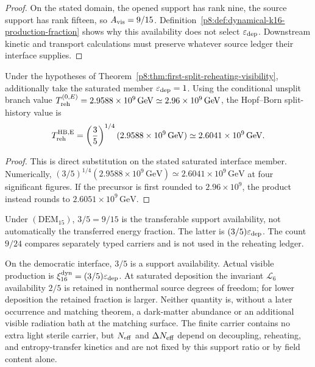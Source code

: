 \documentclass[12pt,a4paper]{article}
\begin{document}
\begin{proof}
On the stated domain, the opened support has rank nine, the source support has
rank fifteen, so \(A_{\rm vis}=9/15\).  Definition~\ref{p8:def:dynamical-k16-production-fraction}
shows why this availability does not select \(\varepsilon_{\rm dep}\).
Downstream kinetic
and transport calculations must preserve whatever source ledger their
interface supplies.
\end{proof}

\begin{corollary}
\label{p8:cor:first-split-reheating-value}
Under the hypotheses of
Theorem~\ref{p8:thm:first-split-reheating-visibility}, additionally take the
saturated member \(\varepsilon_{\rm dep}=1\).  Using the conditional
unsplit branch value
\(T_{\rm reh}^{(0,E)}=2.9588\times10^9\,{\rm GeV}\simeq2.96\times10^9\,{\rm GeV}\),
the Hopf--Born split-history value is
\begin{equation}
\label{p8:eq:Treh-HB-number}
T_{\rm reh}^{\rm HB,E}
=
\left(\frac35\right)^{1/4}
(2.9588\times10^9\,{\rm GeV})
\simeq
2.6041\times10^9\,{\rm GeV}.
\end{equation}
\end{corollary}

\begin{proof}
This is direct substitution on the stated saturated interface member.  Numerically,
\((3/5)^{1/4}(2.9588\times10^9\,\mathrm{GeV})
\simeq2.6041\times10^9\,\mathrm{GeV}\) at four significant figures.
If the precursor is first rounded to \(2.96\times10^9\), the product
instead rounds to \(2.6051\times10^9\,\mathrm{GeV}\).
\end{proof}

\begin{remark}
\label{p8:rem:first-split-normalization}
Under \((\mathrm{DEM}_{15})\), \(3/5=9/15\) is the transferable support
availability, not automatically the transferred energy fraction.  The latter
is \((3/5)\varepsilon_{\rm dep}\).  The count \(9/24\) compares separately
typed carriers and is not used in the reheating ledger.
\end{remark}

\begin{remark}
\label{p8:rem:first-split-no-energy-loss}
On the democratic interface, \(3/5\) is a support availability.  Actual
visible production is \(\xi_{16}^{\rm dyn}=(3/5)\varepsilon_{\rm dep}\).
At saturated deposition the invariant \(\mathcal L_6\) availability \(2/5\)
is retained in nonthermal source degrees of freedom; for lower deposition the
retained fraction is larger.  Neither quantity is, without a later occurrence
and matching theorem, a dark-matter abundance or an
additional visible radiation bath at the matching surface.  The finite carrier
contains no extra light sterile carrier, but \(N_{\rm eff}\) and
\(\Delta N_{\rm eff}\) depend on decoupling, reheating, and entropy-transfer
kinetics and are not fixed by this support ratio or by field content alone.
\end{remark}
\end{document}
